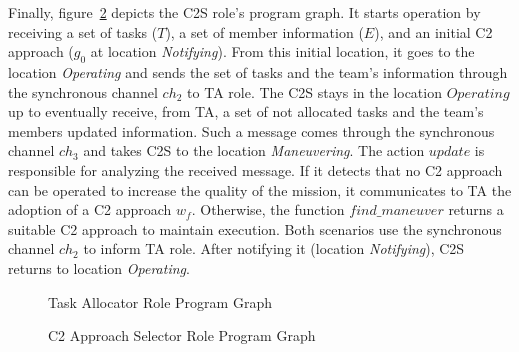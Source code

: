 Finally, figure~\ref{fig:C2S} depicts the C2S role's program graph. It starts operation by receiving a set of tasks ($T$), a set of member information ($E$), and an initial C2 approach ($g_0$ at location \textit{Notifying}). From this initial location, it goes to the location \textit{Operating} and sends the set of tasks and the team's information through the synchronous channel $ch_2$ to TA role. The C2S stays in the location $Operating$ up to eventually receive, from TA, a set of not allocated tasks and the team's members updated information. Such a message comes through the synchronous channel $ch_3$ and takes C2S to the location \textit{Maneuvering}. The action $update$ is responsible for analyzing the received message. If it detects that no C2 approach can be operated to increase the quality of the mission, it communicates to TA the adoption of a C2 approach $w_f$. Otherwise, the function $find\_maneuver$ returns a suitable C2 approach to maintain execution. Both scenarios use the synchronous channel $ch_2$ to inform TA role. After notifying it (location \textit{Notifying}), C2S returns to location \textit{Operating}.

\begin{figure}[!ht]
    \centering
    \scalebox{.65}{}
    \caption{Task Allocator Role Program Graph}
    \label{fig:TA}
\end{figure}

\begin{figure}[!ht]
    \centering
    \scalebox{.65}{}
    \caption{C2 Approach Selector Role Program Graph}
    \label{fig:C2S}
\end{figure}

